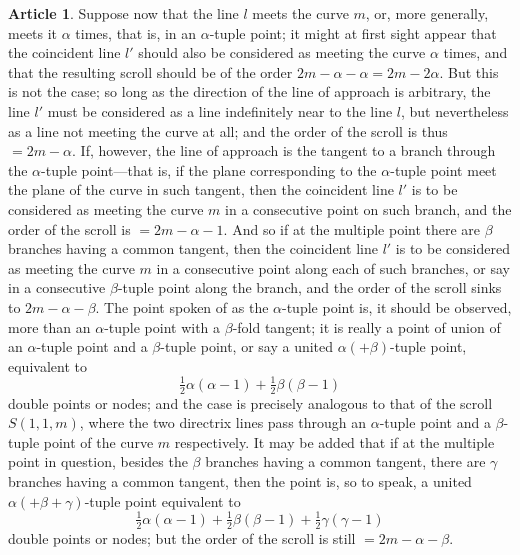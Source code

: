 \documentclass[12pt,a4paper]{article}
\theoremstyle{definition}
\newtheorem{art}{Article}[section]
\begin{document}
\begin{art}
Suppose now that the line $l$ meets the curve $m$, or, more generally, meets it $\alpha$ times, that is, in an $\alpha$-tuple point; it might at first sight appear that the coincident line $l'$ should also be considered as meeting the curve $\alpha$ times, and that the resulting scroll should be of the order $2m - \alpha - \alpha = 2m - 2\alpha$. But this is not the case; so long as the direction of the line of approach is arbitrary, the line $l'$ must be considered as a line indefinitely near to the line $l$, but nevertheless as a line not meeting the curve at all; and the order of the scroll is thus $= 2m - \alpha$. If, however, the line of approach is the tangent to a branch through the $\alpha$-tuple point---that is, if the plane corresponding to the $\alpha$-tuple point meet the plane of the curve in such tangent, then the coincident line $l'$ is to be considered as meeting the curve $m$ in a consecutive point on such branch, and the order of the scroll is $= 2m - \alpha - 1$. And so if at the multiple point there are $\beta$ branches having a common tangent, then the coincident line $l'$ is to be considered as meeting the curve $m$ in a consecutive point along each of such branches, or say in a consecutive $\beta$-tuple point along the branch, and the order of the scroll sinks to $2m - \alpha - \beta$. The point spoken of as the $\alpha$-tuple point is, it should be observed, more than an $\alpha$-tuple point with a $\beta$-fold tangent; it is really a point of union of an $\alpha$-tuple point and a $\beta$-tuple point, or say a united $\alpha (+ \beta)$-tuple point, equivalent to
\[
\tfrac{1}{2}\alpha(\alpha - 1) + \tfrac{1}{2}\beta(\beta - 1)
\]
double points or nodes; and the case is precisely analogous to that of the scroll $S(1, 1, m)$, where the two directrix lines pass through an $\alpha$-tuple point and a $\beta$-tuple point of the curve $m$ respectively. It may be added that if at the multiple point in question, besides the $\beta$ branches having a common tangent, there are $\gamma$ branches having a common tangent, then the point is, so to speak, a united $\alpha (+ \beta + \gamma)$-tuple point equivalent to
\[
\tfrac{1}{2}\alpha(\alpha - 1) + \tfrac{1}{2}\beta(\beta - 1) + \tfrac{1}{2}\gamma(\gamma - 1)
\]
double points or nodes; but the order of the scroll is still $= 2m - \alpha - \beta$.
\end{art}
\end{document}
